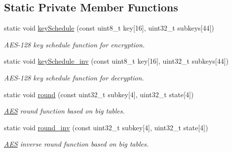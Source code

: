 \subsection*{Static Private Member Functions}
\begin{DoxyCompactItemize}
\item 
\hypertarget{classAES_af562d87960a78f1dcfa67d17205a0bd0}{}static void \hyperlink{classAES_af562d87960a78f1dcfa67d17205a0bd0}{key\+Schedule} (const uint8\+\_\+t key\mbox{[}16\mbox{]}, uint32\+\_\+t subkeys\mbox{[}44\mbox{]})\label{classAES_af562d87960a78f1dcfa67d17205a0bd0}

\begin{DoxyCompactList}\small\item\em A\+E\+S-\/128 key schedule function for encryption. \end{DoxyCompactList}\item 
\hypertarget{classAES_af946b7b177e17430cdd56b63293152d1}{}static void \hyperlink{classAES_af946b7b177e17430cdd56b63293152d1}{key\+Schedule\+\_\+inv} (const uint8\+\_\+t key\mbox{[}16\mbox{]}, uint32\+\_\+t subkeys\mbox{[}44\mbox{]})\label{classAES_af946b7b177e17430cdd56b63293152d1}

\begin{DoxyCompactList}\small\item\em A\+E\+S-\/128 key schedule function for decryption. \end{DoxyCompactList}\item 
\hypertarget{classAES_a4a23226c2a4fd6289d98640be624e132}{}static void \hyperlink{classAES_a4a23226c2a4fd6289d98640be624e132}{round} (const uint32\+\_\+t subkey\mbox{[}4\mbox{]}, uint32\+\_\+t state\mbox{[}4\mbox{]})\label{classAES_a4a23226c2a4fd6289d98640be624e132}

\begin{DoxyCompactList}\small\item\em \hyperlink{classAES}{A\+E\+S} round function based on big tables. \end{DoxyCompactList}\item 
\hypertarget{classAES_a173cd336343e66672c9e6c3fb6c8e34f}{}static void \hyperlink{classAES_a173cd336343e66672c9e6c3fb6c8e34f}{round\+\_\+inv} (const uint32\+\_\+t subkey\mbox{[}4\mbox{]}, uint32\+\_\+t state\mbox{[}4\mbox{]})\label{classAES_a173cd336343e66672c9e6c3fb6c8e34f}

\begin{DoxyCompactList}\small\item\em \hyperlink{classAES}{A\+E\+S} inverse round function based on big tables. \end{DoxyCompactList}\end{DoxyCompactItemize}
